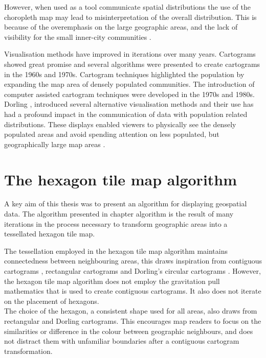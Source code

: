 \documentclass{monashthesis}
\begin{document}
However, when used as a tool communicate spatial distributions the use of the choropleth map may lead to misinterpretation of the overall distribution. This is because of the overemphasis on the large geographic areas, and the lack of visibility for the small inner-city communities \autocite{ACTUC}.

Visualisation methods have improved in iterations over many years. Cartograms \autocite{ACCAC} showed great promise and several algorithms were presented to create cartograms in the 1960s and 1970s. Cartogram techniques highlighted the population by expanding the map area of densely populated communities.
The introduction of computer assisted cartogram techniques were developed in the 1970s and 1980s. Dorling \autocite{TVSSS}, \autocite{ACTUC} introduced several alternative visualisation methods and their use has had a profound impact in the communication of data with population related distributions. These displays enabled viewers to physically see the densely populated areas and avoid spending attention on less populated, but geographically large map areas \autocite{CTTMB}.

\hypertarget{the-hexagon-tile-map-algorithm}{%
\section{The hexagon tile map algorithm}\label{the-hexagon-tile-map-algorithm}}

A key aim of this thesis was to present an algorithm for displaying geospatial data. The algorithm presented in chapter algorithm is the result of many iterations in the process necessary to transform geographic areas into a tessellated hexagon tile map.

The tessellation employed in the hexagon tile map algorithm maintains connectedness between neighbouring areas, this draws inspiration from contiguous cartograms \autocite{ACA}, rectangular cartograms \autocite{RSCW} and Dorling's circular cartograms \autocite{ACTUC}. However, the hexagon tile map algorithm does not employ the gravitation pull mathematics that is used to create contiguous cartograms. It also does not iterate on the placement of hexagons.\\
The choice of the hexagon, a consistent shape used for all areas, also draws from rectangular and Dorling cartograms. This encourages map readers to focus on the similarities or difference in the colour between geographic neighbours, and does not distract them with unfamiliar boundaries after a contiguous cartogram transformation.
\end{document}
